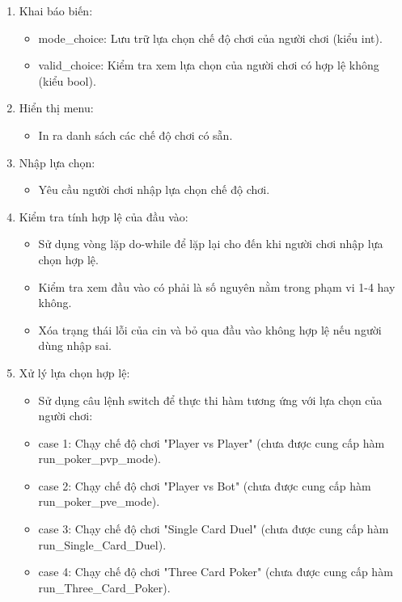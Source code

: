 \documentclass{article}
\begin{document}
 \begin{description}
            \begin{enumerate}
            \item Khai báo biến:
                \begin{itemize}
                    \item mode\_choice: Lưu trữ lựa chọn chế độ chơi của người chơi (kiểu int).
                    \item valid\_choice: Kiểm tra xem lựa chọn của người chơi có hợp lệ không (kiểu bool).
                \end{itemize}
            \item Hiển thị menu:
                \begin{itemize}
                    \item In ra danh sách các chế độ chơi có sẵn.
                \end{itemize}
            \item Nhập lựa chọn:
                \begin{itemize}
                    \item Yêu cầu người chơi nhập lựa chọn chế độ chơi.
                \end{itemize}
            \item Kiểm tra tính hợp lệ của đầu vào:
                \begin{itemize}
                    \item Sử dụng vòng lặp do-while để lặp lại cho đến khi người chơi nhập lựa chọn hợp lệ.
                    \item Kiểm tra xem đầu vào có phải là số nguyên nằm trong phạm vi 1-4 hay không.
                    \item Xóa trạng thái lỗi của cin và bỏ qua đầu vào không hợp lệ nếu người dùng nhập sai.
                \end{itemize}
            \item Xử lý lựa chọn hợp lệ:
                \begin{itemize}
                    \item Sử dụng câu lệnh switch để thực thi hàm tương ứng với lựa chọn của người chơi:
                    \item case 1: Chạy chế độ chơi "Player vs Player" (chưa được cung cấp hàm run\_poker\_pvp\_mode).
                    \item case 2: Chạy chế độ chơi "Player vs Bot" (chưa được cung cấp hàm run\_poker\_pve\_mode).
                    \item case 3: Chạy chế độ chơi "Single Card Duel" (chưa được cung cấp hàm run\_Single\_Card\_Duel).
                    \item case 4: Chạy chế độ chơi "Three Card Poker" (chưa được cung cấp hàm run\_Three\_Card\_Poker).
                \end{itemize}
        \end{enumerate}
    \end{description}
\end{document}
